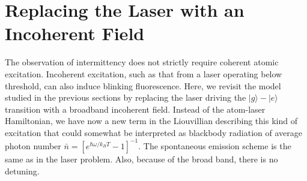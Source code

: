 \documentclass[twocolumn,aps,eqsecnum,showkeys,amsmath]{revtex4-2}
\begin{document}
\section{Replacing the Laser with an Incoherent Field}
%
The observation of intermittency does not strictly require coherent 
atomic excitation. Incoherent excitation, such as that from a laser 
operating below threshold, can also induce blinking fluorescence. Here, 
we revisit the model studied in the previous sections by replacing the 
laser driving the $|g \rangle - |e \rangle$ transition with a broadband 
incoherent field. Instead of the atom-laser Hamiltonian, we have now a 
new term in the Liouvillian describing this kind of excitation that could 
somewhat be interpreted as blackbody radiation of average photon 
number $\bar{n} = [e^{\hbar \omega/k_BT} -1]^{-1}$. The spontaneous 
emission scheme is the same as in the laser problem. Also, because of 
the broad band, there is no detuning. 
\end{document}
